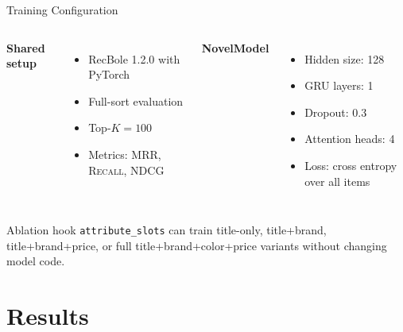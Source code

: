 \documentclass[10pt,aspectratio=169]{beamer}
\newcommand{\metric}[1]{\textsc{#1}}
\newcommand{\code}[1]{\texttt{#1}}
\begin{document}
\begin{frame}{Training Configuration}
  \begin{columns}[T,onlytextwidth]
      \textbf{Shared setup}
      \begin{itemize}
        \item RecBole 1.2.0 with PyTorch
        \item Full-sort evaluation
        \item Top-\(K=100\)
        \item Metrics: \metric{MRR}, \metric{Recall}, \metric{NDCG}
      \end{itemize}

      \textbf{NovelModel}
      \begin{itemize}
        \item Hidden size: 128
        \item GRU layers: 1
        \item Dropout: 0.3
        \item Attention heads: 4
        \item Loss: cross entropy over all items
      \end{itemize}
  \end{columns}

  \vspace{0.8em}
  \begin{block}{Ablation hook}
    \code{attribute\_slots} can train title-only, title+brand, title+brand+price, or full title+brand+color+price variants without changing model code.
  \end{block}
\end{frame}

\section{Results}
\end{document}
